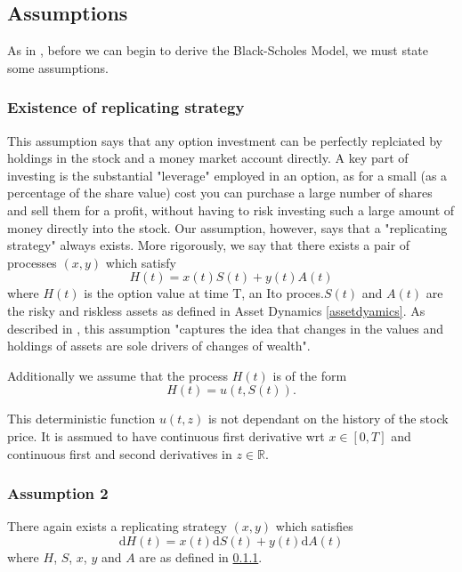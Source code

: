 \documentclass[11pt]{article} %
\begin{document}
\subsection{Assumptions}

As in \cite{blackscholes}, before we can begin to derive the Black-Scholes Model, we must 
state some assumptions.
\subsubsection{Existence of replicating strategy}\label{replicatingstrategy}

This assumption says that any option investment can be perfectly replciated by holdings in 
the stock and a money market account directly. A key part of investing is the substantial 
"leverage" employed in an option, as for a small (as a percentage of the share value) cost 
you can purchase a large number of shares and sell them for a profit, without having to risk 
investing such a large amount of money directly into the stock. Our assumption, however, says 
that a "replicating strategy" always exists. More rigorously, we say that there exists a 
pair of processes $(x,y)$ which satisfy 
\begin{equation}
    H(t) = x(t)S(t) + y(t)A(t)
\end{equation}
where $H(t)$ is the option value at time T, an Ito proces.$S(t)$ and $A(t)$ are the risky 
and riskless assets as defined in Asset Dynamics \ref{assetdyamics}. 
As described in \cite{blackscholes}, this assumption "captures the idea that changes in the 
values and holdings of assets are sole drivers of changes of wealth".

Additionally we assume that the process $H(t)$ is of  the form 
\begin{equation}
    H(t) = u(t, S(t)).
\end{equation}

This deterministic function $u(t,z)$ is not dependant on the history of the stock price. 
It is assmued to have continuous first derivative wrt $x \in [0,T]$ and continuous first 
and second derivatives in $z \in \mathbb{R}$.

\subsubsection{Assumption 2}
There again exists a replicating strategy $(x,y)$ which satisfies 
\begin{equation}\label{replicatingderivative}
    \mathrm{d} H(t) = x(t)\mathrm{d} S(t) + y(t)\mathrm{d} A(t)
\end{equation}
where $H$, $S$, $x$, $y$ and $A$ are as defined in \ref{replicatingstrategy}.
\end{document}
